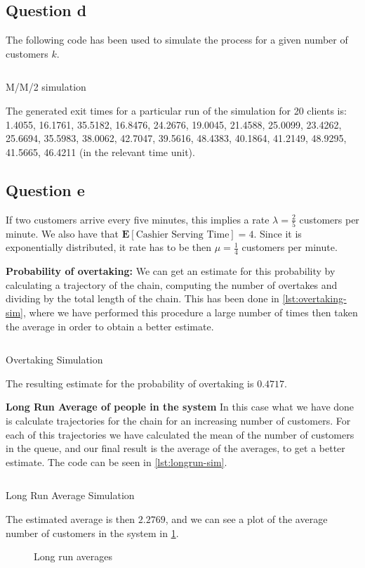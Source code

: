 \documentclass[11pt, a4paper]{article}
\begin{document}
\subsection*{Question d}
The following code has been used to simulate the process for a given number of customers $k$.

\begin{listing}[H]
	\inputminted[firstline = 143, lastline = 166]{R}{../main.R}
	\caption{M/M/2 simulation}
	\label{lst:mm2sim}
\end{listing}
The generated exit times for a particular run of the simulation for 20 clients is:  1.4055, 16.1761, 35.5182, 16.8476, 24.2676, 19.0045, 21.4588, 25.0099, 23.4262, 25.6694, 35.5983, 38.0062, 42.7047,
39.5616, 48.4383, 40.1864, 41.2149, 48.9295, 41.5665, 46.4211 (in the relevant time unit).

\subsection*{Question e}
If two customers arrive every five minutes, this implies a rate $\lambda = \frac{2}{5}$ customers per minute. We also have that $\mathbf{E}\left[ \text{Cashier Serving Time}\right] = 4$. Since it is exponentially distributed, it rate has to be then $\mu = \frac{1}{4}$ customers per minute.


\textbf{Probability of overtaking:} We can get an estimate for this probability by calculating a trajectory of the chain, computing the number of overtakes and dividing by the total length of the chain. This has been done in \cref{lst:overtaking-sim}, where we have performed this procedure a large number of times then taken the average in order to obtain a better estimate.
\begin{listing}[H]
	\inputminted[firstline = 175, lastline = 187]{R}{../main.R}
	\caption{Overtaking Simulation}
	\label{lst:overtaking-sim}
\end{listing}
The resulting estimate for the probability of overtaking is $0.4717$.

\textbf{Long Run Average of people in the system}
In this case what we have done is calculate trajectories for the chain for an increasing number of customers. For each of this trajectories we have calculated the mean of the number of customers in the queue, and our final result is the average of the averages, to get a better estimate. The code can be seen in \cref{lst:longrun-sim}.
\begin{listing}[H]
	\inputminted[firstline = 198, lastline = 203]{R}{../main.R}
	\caption{Long Run Average Simulation}
	\label{lst:longrun-sim}
\end{listing}
The estimated average is then $2.2769$, and we can see a plot of the average number of customers in the system in \cref{fig:lravg}.
\begin{figure}[H]
	\centering
	
	\caption{Long run averages}
	\label{fig:lravg}
\end{figure}
\end{document}
